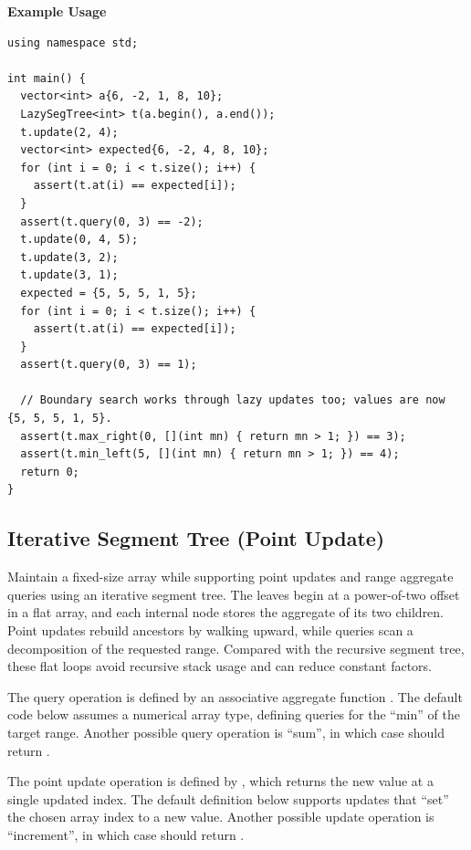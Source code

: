 \textbf{Example Usage}\par
\begin{lstlisting}[style=cpp]
using namespace std;

int main() {
  vector<int> a{6, -2, 1, 8, 10};
  LazySegTree<int> t(a.begin(), a.end());
  t.update(2, 4);
  vector<int> expected{6, -2, 4, 8, 10};
  for (int i = 0; i < t.size(); i++) {
    assert(t.at(i) == expected[i]);
  }
  assert(t.query(0, 3) == -2);
  t.update(0, 4, 5);
  t.update(3, 2);
  t.update(3, 1);
  expected = {5, 5, 5, 1, 5};
  for (int i = 0; i < t.size(); i++) {
    assert(t.at(i) == expected[i]);
  }
  assert(t.query(0, 3) == 1);

  // Boundary search works through lazy updates too; values are now {5, 5, 5, 1, 5}.
  assert(t.max_right(0, [](int mn) { return mn > 1; }) == 3);
  assert(t.min_left(5, [](int mn) { return mn > 1; }) == 4);
  return 0;
}
\end{lstlisting}
\subsection{Iterative Segment Tree (Point Update)}
\label{sec:2.5.7}
Maintain a fixed-size array while supporting point updates and range aggregate queries using an iterative segment tree. The leaves begin at a power-of-two offset in a flat array, and each internal node stores the aggregate of its two children. Point updates rebuild ancestors by walking upward, while queries scan a decomposition of the requested range. Compared with the recursive segment tree, these flat loops avoid recursive stack usage and can reduce constant factors.

The query operation is defined by an associative aggregate function . The default code below assumes a numerical array type, defining queries for the ``min'' of the target range. Another possible query operation is ``sum'', in which case  should return .

The point update operation is defined by , which returns the new value at a single updated index. The default definition below supports updates that ``set'' the chosen array index to a new value. Another possible update operation is ``increment'', in which case  should return .

